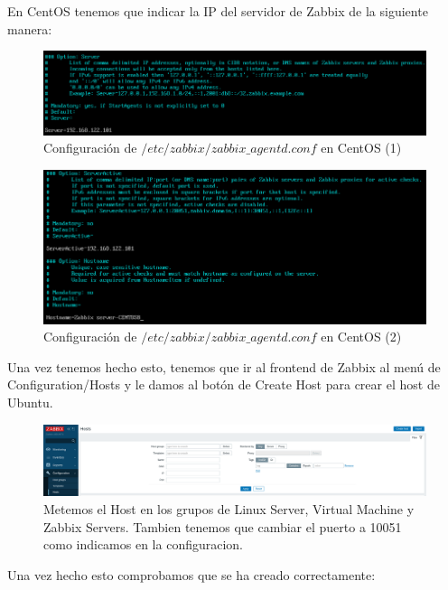 En CentOS tenemos que indicar la IP del servidor de Zabbix de la siguiente manera:

\begin{figure}[H]
	\centering
	\includegraphics[scale=0.5]{graphics/img22}
	\caption{Configuración de $/etc/zabbix/zabbix\_agentd.conf$ en CentOS (1)}
\end{figure}

\begin{figure}[H]
	\centering
	\includegraphics[scale=0.5]{graphics/img23}
	\caption{Configuración de $/etc/zabbix/zabbix\_agentd.conf$ en CentOS (2)}
\end{figure}

Una vez tenemos hecho esto, tenemos que ir al frontend de Zabbix al menú de Configuration/Hosts y le damos al botón de Create Host para crear el host de Ubuntu.

\begin{figure}[H]
	\centering
	\includegraphics[scale=0.25]{graphics/img24}
	\caption{Metemos el Host en los grupos de Linux Server, Virtual Machine y Zabbix Servers. Tambien tenemos que cambiar el puerto a 10051 como indicamos en la configuracion.}
\end{figure}

\newpage
Una vez hecho esto comprobamos que se ha creado correctamente:

